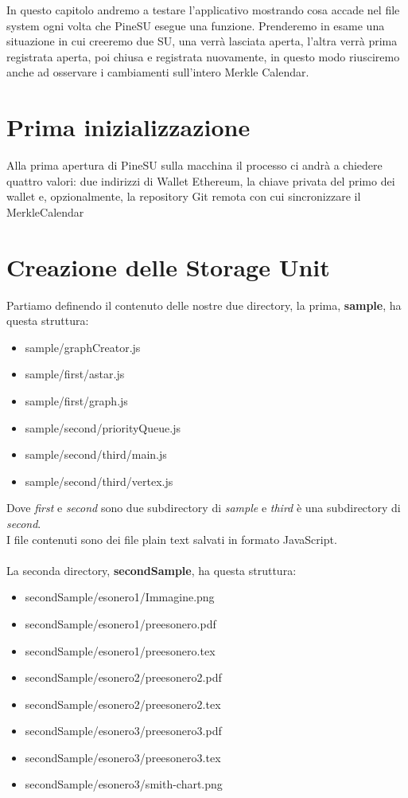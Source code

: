 In questo capitolo andremo a testare l'applicativo mostrando cosa accade nel
file system ogni volta che PineSU esegue una funzione.
Prenderemo in esame una situazione in cui creeremo due SU, una verrà lasciata aperta,
l'altra verrà prima registrata aperta, poi chiusa e registrata nuovamente, in questo modo
riusciremo anche ad osservare i cambiamenti sull'intero Merkle Calendar.

\section{Prima inizializzazione}

Alla prima apertura di PineSU sulla macchina il processo ci andrà a chiedere
quattro valori: due indirizzi di Wallet Ethereum, la chiave privata del primo dei wallet e,
opzionalmente, la repository Git remota con cui sincronizzare il MerkleCalendar

\section{Creazione delle Storage Unit}

Partiamo definendo il contenuto delle nostre due directory, la prima,
\textbf{sample}, ha questa struttura:
\begin{itemize}
    \itemsep0em
    \item sample/graphCreator.js
    \item sample/first/astar.js
    \item sample/first/graph.js
    \item sample/second/priorityQueue.js
    \item sample/second/third/main.js
    \item sample/second/third/vertex.js
\end{itemize}
Dove \emph{first} e \emph{second} sono due subdirectory di \emph{sample}
e \emph{third} è una subdirectory di \emph{second}. \\
I file contenuti sono dei file plain text salvati in formato JavaScript. \\ \\
La seconda directory, \textbf{secondSample}, ha questa struttura:
\begin{itemize}
    \itemsep0em
    \item secondSample/esonero1/Immagine.png
    \item secondSample/esonero1/preesonero.pdf
    \item secondSample/esonero1/preesonero.tex
    \item secondSample/esonero2/preesonero2.pdf
    \item secondSample/esonero2/preesonero2.tex
    \item secondSample/esonero3/preesonero3.pdf
    \item secondSample/esonero3/preesonero3.tex
    \item secondSample/esonero3/smith-chart.png
\end{itemize}

